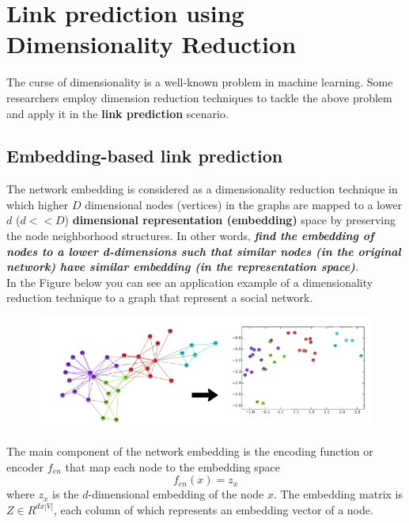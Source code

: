 \section{Link prediction using Dimensionality Reduction}

The curse of dimensionality is a well-known problem in machine learning.
Some researchers employ dimension reduction techniques to tackle the
above problem and apply it in the \textbf{link prediction} scenario.

\subsection{Embedding-based link prediction}

The network embedding is considered as a dimensionality reduction
technique in which higher \(D\) dimensional nodes (vertices) in the
graphs are mapped to a lower \(d\) (\(d << D\)) \textbf{dimensional
    representation (embedding)} space by preserving the node neighborhood
structures. In other words, \textbf{\emph{find the embedding of nodes to
        a lower d-dimensions such that similar nodes (in the original network)
        have similar embedding (in the representation space)}}.\\ In the Figure
below you can see an application example of a dimensionality reduction
technique to a graph that represent a social network.

\begin{figure}[H]
    \centering
    \includegraphics[width=12cm, keepaspectratio]{capitoli/methods/imgs/img4.png}
\end{figure}

The main component of the network embedding is the encoding function or
encoder \(f_{en}\) that map each node to the embedding space
\[f_{en}(x) = z_x\] where \(z_x\) is the \(d\)-dimensional embedding of
the node \(x\). The embedding matrix is \(Z \in R^{d x |V|}\), each
column of which represents an embedding vector of a node.\\


